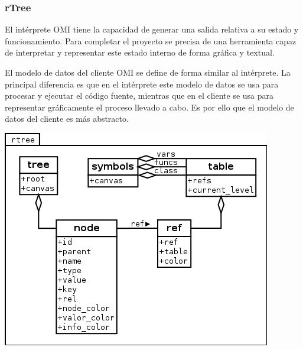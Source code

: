 \subsubsection {rTree} 
El intérprete OMI tiene la capacidad de generar una salida relativa
a su estado y funcionamiento. Para completar el proyecto se precisa 
de una herramienta capaz de interpretar y representar este estado 
interno de forma gráfica y textual. 

El modelo de datos del cliente OMI se define de forma similar al intérprete.
La principal diferencia es que en el intérprete este modelo de datos se usa para procesar y 
ejecutar el código fuente, mientras que en el cliente se usa para representar gráficamente 
el proceso llevado a cabo. Es por ello que el modelo de datos del cliente es más abstracto. 

\begin{center}
\includegraphics[scale=0.6]{rtree.png} \\
\end{center}

